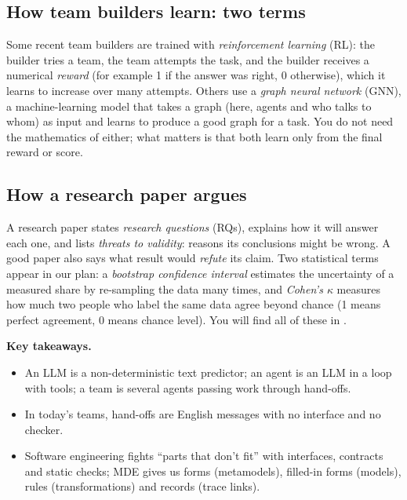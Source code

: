 \documentclass[10pt,a4paper]{article}
\newenvironment{takeaway}{%
  \begin{tcolorbox}[enhanced, colback=keybg, colframe=keybg, arc=0pt, boxrule=0pt,
     borderline west={2.2pt}{0pt}{keybar}, left=8pt, right=8pt, top=5pt, bottom=5pt,
     before skip=8pt, after skip=8pt]
  \textsf{\bfseries\color{keybar}Key takeaways.}\par\smallskip}{\end{tcolorbox}}
\begin{document}
\subsection{How team builders learn: two terms}

Some recent team builders are trained with \emph{reinforcement learning}
(RL): the builder tries a team, the team attempts the task, and the builder
receives a numerical \emph{reward} (for example 1 if the answer was right,
0 otherwise), which it learns to increase over many attempts. Others use a
\emph{graph neural network} (GNN), a machine-learning model that takes a
graph (here, agents and who talks to whom) as input and learns to produce
a good graph for a task. You do not need the mathematics of either; what
matters is that both learn only from the final reward or score.

\subsection{How a research paper argues}

A research paper states \emph{research questions} (RQs), explains how it
will answer each one, and lists \emph{threats to validity}: reasons its
conclusions might be wrong. A good paper also says what result would
\emph{refute} its claim. Two statistical terms appear in our plan: a
\emph{bootstrap confidence interval} estimates the uncertainty of a
measured share by re-sampling the data many times, and \emph{Cohen's
$\kappa$} measures how much two people who label the same data agree beyond
chance (1 means perfect agreement, 0 means chance level). You will find all of these in
.

\begin{takeaway}
\begin{itemize}
\item An LLM is a non-deterministic text predictor; an agent is an LLM in a
loop with tools; a team is several agents passing work through hand-offs.
\item In today's teams, hand-offs are English messages with no interface and
no checker.
\item Software engineering fights ``parts that don't fit'' with interfaces,
contracts and static checks; MDE gives us forms (metamodels), filled-in forms
(models), rules (transformations) and records (trace links).
\end{itemize}
\end{takeaway}
\end{document}
